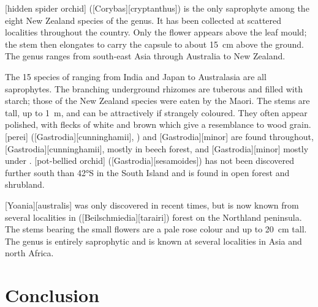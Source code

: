 [hidden spider orchid] ([Corybas][cryptanthus]) is the only saprophyte among the eight New Zealand species of the genus.
It has been collected at scattered localities throughout the country.
Only the flower appears above the leaf mould; the stem then elongates to carry the capsule to about \SI{15}{\centi\metre} above the ground.
The genus ranges from south-east Asia through Australia to New Zealand.

The 15 species of  ranging from India and Japan to Australasia are all saprophytes.
The branching underground rhizomes are tuberous and filled with starch; those of the New Zealand species were eaten by the Maori.
The stems are tall, up to \SI{1}{\metre}, and can be attractively if strangely coloured.
They often appear polished, with flecks of white and brown which give a resemblance to wood grain.
[perei] ([Gastrodia][cunninghamii], ) and [Gastrodia][minor] are found throughout, [Gastrodia][cunninghamii], mostly in beech forest, and [Gastrodia][minor] mostly under .
[pot-bellied orchid] ([Gastrodia][sesamoides]) has not been discovered further south than \ang{42}S in the South Island and is found in open forest and shrubland.

[Yoania][australis] was only discovered in recent times, but is now known from several localities in  ([Beilschmiedia][tarairi]) forest on the Northland peninsula.
The stems bearing the small flowers are a pale rose colour and up to \SI{20}{\centi\metre} tall.
The genus is entirely saprophytic and is known at several localities in Asia and north Africa.

\section{Conclusion}

